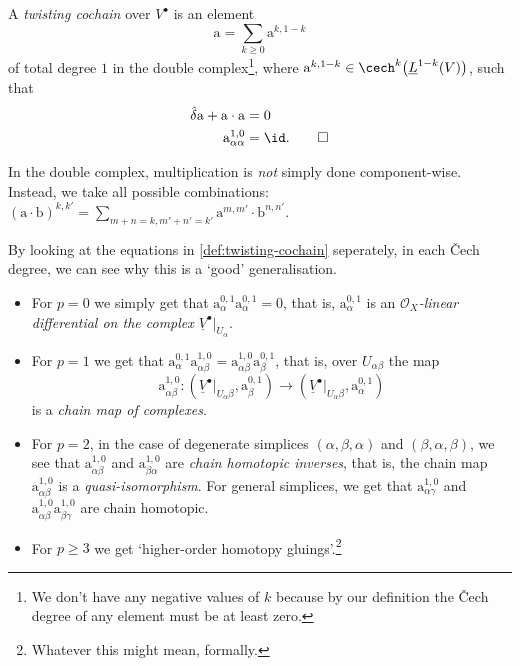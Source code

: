         \begin{definition}\label{def:twisting-cochain}
            A \textit{twisting cochain} over $V^\bullet$ is an element
            \[\mathrm{a}=\sum_{k\geqslant0}\mathrm{a}^{k,1-k}\]
            of total degree $1$ in the double complex\footnote{We don't have any negative values of $k$ because by our definition the Čech degree of any element must be at least zero.}, where $\mathrm{a}^{k,1-k}\in\cech^k\big(\underline{L}^{1-k}(V)\big)$, such that
            \begin{align*}
                \hat{\delta}\mathrm{a}+\mathrm{a}\cdot\mathrm{a}&=0\\
                \mathrm{a}^{1,0}_{\alpha\alpha}&=\id.\qedhere
            \end{align*}
        \end{definition}

        \begin{note}
            In the double complex, multiplication is \textit{not} simply done component-wise.
            Instead, we take all possible combinations: $(\mathrm{a}\cdot\mathrm{b})^{k,k'}=\sum_{m+n=k,m'+n'=k'}\mathrm{a}^{m,m'}\cdot\mathrm{b}^{n,n'}$.
        \end{note}

        By looking at the equations in \cref{def:twisting-cochain} seperately, in each Čech degree, we can see why this is a `good' generalisation.
        \begin{itemize}
            \item For $p=0$ we simply get that $\mathrm{a}^{0,1}_{\alpha}\mathrm{a}^{0,1}_{\alpha}=0$, that is, $\mathrm{a}^{0,1}_{\alpha}$ is an \textit{$\mathcal{O}_X$-linear differential on the complex $\underline{V}^\bullet|_{U_\alpha}$}.
            \item For $p=1$ we get that $\mathrm{a}^{0,1}_{\alpha}\mathrm{a}^{1,0}_{\alpha\beta} = \mathrm{a}^{1,0}_{\alpha\beta}\mathrm{a}^{0,1}_{\beta}$, that is, over $U_{\alpha\beta}$ the map
                \[\mathrm{a}^{1,0}_{\alpha\beta}\colon (\underline{V}^\bullet|_{U_\alpha\beta},\mathrm{a}^{0,1}_{\beta})\to (\underline{V}^\bullet|_{U_\alpha\beta},\mathrm{a}^{0,1}_{\alpha})\]
                is a \textit{chain map of complexes}.
            \item For $p=2$, in the case of degenerate simplices $(\alpha,\beta,\alpha)$ and $(\beta,\alpha,\beta)$, we see that $\mathrm{a}^{1,0}_{\alpha\beta}$ and $\mathrm{a}^{1,0}_{\beta\alpha}$ are \textit{chain homotopic inverses}, that is, the chain map $\mathrm{a}^{1,0}_{\alpha\beta}$ is a \textit{quasi-isomorphism}.
                For general simplices, we get that $\mathrm{a}^{1,0}_{\alpha\gamma}$ and $\mathrm{a}^{1,0}_{\alpha\beta}\mathrm{a}^{1,0}_{\beta\gamma}$ are chain homotopic.
            \item For $p\geqslant3$ we get `higher-order homotopy gluings'.\footnote{Whatever this might mean, formally.}
        \end{itemize}

